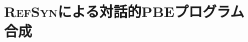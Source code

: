 \documentclass[11pt, a4paper, oneside, twocolumn]{jsarticle}
\newcommand{\mysys}{\textsc{RefSyn}}
\begin{document}


\section{\mysys{}による対話的PBEプログラム合成}
\end{document}
